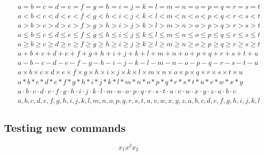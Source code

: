 \documentclass[12pt,a4paper,onecolumn]{article}
\newcommand{\xsb}{x_{1}}
\newcommand{\xsp}{x^{2}}
\newcommand{\xsbnum}[1]{x_{#1}}
\begin{document}
\begin{eqnarray*}
&&a = b = c = d = e = f = g = h = i = j = k = l = m = n = o = p = q = r = s = t\\
&&a < b < c < d < e < f < g < h < i < j < k < l < m < n < o < p < q < r < s < t\\
&&a > b > c > d > e > f > g > h > i > j > k > l > m > n > o > p > q > r > s > t\\
&&a \leq b \leq c \leq d \leq e \leq f \leq g \leq h \leq i \leq j \leq k \leq l \leq m \leq n \leq o \leq p \leq q \leq r \leq s \leq t\\
&&a \geq b \geq c \geq d \geq e \geq f \geq g \geq h \geq i \geq j \geq k \geq l \geq m \geq n \geq o \geq p \geq q \geq r \geq s \geq t\\
&&a + b + c + d + e + f + g + h + i + j + k + l + m + n + o + p + q + r + s + t + u\\
&&a - b - c - d - e - f - g - h - i - j - k - l - m - n - o - p - q - r - s - t - u\\
&&a \times b \times c \times d \times e \times f \times g \times h \times i \times j \times k \times l \times m \times n \times o \times p \times q \times r \times s \times t \times u\\
&&a * b * c * d * e * f * g * h * i * j * k * l * m * n * o * p * q * r * s * t * u * v * w * x * y\\
&&a \cdot b \cdot c \cdot d \cdot e \cdot f \cdot g \cdot h \cdot i \cdot j \cdot k \cdot l \cdot m \cdot n \cdot o \cdot p \cdot q \cdot r \cdot s \cdot t \cdot u \cdot v \cdot w \cdot x \cdot y \cdot z \cdot a \cdot b \cdot c\\
&&a , b , c , d , e , f , g , h , i , j , k , l , m , n , o , p , q , r , s , t , u , v , w , x , y , z , a , b , c , d , e , f, g , h , i , j , k , l
\end{eqnarray*}

\subsection{Testing new commands\label{test}}
\[ 
\xsb \xsp \xsbnum{2}
\]
\end{document}
